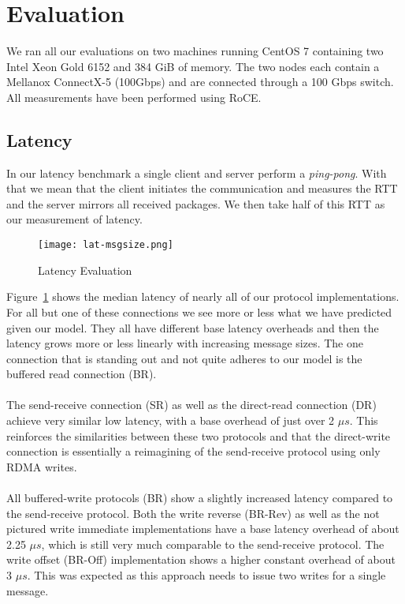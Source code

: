 \section{Evaluation}

We ran all our evaluations on two machines running CentOS 7 containing two Intel Xeon Gold 6152 and 384 GiB of memory.
The two nodes each contain a Mellanox ConnectX-5 (100Gbps) and are connected through a 100 Gbps switch. All measurements
have been performed using RoCE.

\subsection{Latency}

 In our latency benchmark a single client and server perform a \emph{ping-pong}. With that 
we mean that the client initiates the communication and measures the RTT and the server mirrors all received packages. 
We then take half of this RTT as our measurement of latency.

\begin{figure}[h]
\texttt{[image: lat-msgsize.png]}
\caption{Latency Evaluation}
\label{fig:plot-lat}
\end{figure}


Figure~\ref{fig:plot-lat} shows the median latency of nearly all of our protocol implementations. For all but one of these 
connections we see more or less what we have predicted given our model. They all have different base latency overheads
and then the latency grows more or less linearly with increasing message sizes. The one connection that is standing out
and not quite adheres to our model is the buffered read connection (BR).

\paragraph{} The send-receive connection (SR) as well as the direct-read connection (DR) achieve very similar low latency,
with a base overhead of just over 2 $\mu s$. This reinforces the similarities between these two protocols and that the 
direct-write connection is essentially a reimagining of the send-receive protocol using only RDMA writes.



\paragraph{} All buffered-write protocols (BR) show a slightly increased latency compared to the send-receive protocol.
Both the write reverse (BR-Rev) as well as the not pictured write immediate implementations have a base latency overhead 
of about 2.25 $\mu s$, which is still very much comparable to the send-receive protocol. The write offset 
(BR-Off) implementation shows a higher constant overhead of about 3 $\mu s$. This was expected as this approach needs to issue 
two writes for a single message.


